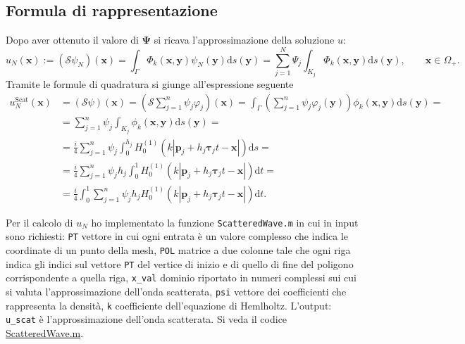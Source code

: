 \subsection{Formula di rappresentazione} \label{ScatteredWave}
Dopo aver ottenuto il valore di $\bm{\Psi}$ si ricava l'approssimazione della soluzione $u$:
\begin{equation}
	u_N(\textbf{x}) := (\mathcal{S}\psi_N)(\textbf{x}) = \int_\Gamma \Phi_k(\textbf{x},\textbf{y}) \psi_N(\textbf{y}) \mathrm{d}s(\textbf{y}) = \sum_{j=1}^N \Psi_j \int_{K_j} \Phi_k(\textbf{x},\textbf{y}) \mathrm{d}s(\textbf{y}), \qquad \textbf{x} \in \Omega_+.
\end{equation}
Tramite le formule di quadratura si giunge all'espressione seguente
\begin{align*}
	u^{\text{Scat}}_N(\textbf{x}) &= (\mathcal{S}\psi)(\textbf{x}) = \left(\mathcal{S} \sum_{j=1}^n \psi_j \varphi_j \right) (\textbf{x}) = \int_{\Gamma} \left( \sum_{j=1}^n \psi_j \varphi_j (\textbf{y}) \right) \phi_k(\textbf{x},\textbf{y}) \mathrm{d}s(\textbf{y}) = \\
	&= \sum_{j=1}^n \psi_j \int_{K_j} \phi_k(\textbf{x},\textbf{y}) \mathrm{d}s(\textbf{y}) = \\
	&= \frac{i}{4} \sum_{j=1}^n \psi_j \int_0^{h_j} H_0^{(1)}(k|\textbf{p}_j + h_j\bm{\tau}_jt -\textbf{x}|) \mathrm{d}s = \\
	&= \frac{i}{4} \sum_{j=1}^n \psi_j h_j \int_0^1 H^{(1)}_0 (k|\textbf{p}_j + h_j\bm{\tau}_jt -\textbf{x}|) \mathrm{d}t = \\
	&= \frac{i}{4} \int_0^1 \sum_{j=1}^n \psi_j h_j H_0^{(1)} (k|\textbf{p}_j + h_j\bm{\tau}_jt -\textbf{x}|) \mathrm{d}t.
\end{align*}

Per il calcolo di $u_N$ ho implementato la funzione \verb|ScatteredWave.m| in cui in input sono richiesti: \verb|PT| vettore in cui ogni entrata è un valore complesso che indica le coordinate di un punto della mesh, \verb|POL| matrice a due colonne tale che ogni riga indica gli indici sul vettore \verb|PT| del vertice di inizio e di quello di fine del poligono corrispondente a quella riga, \verb|x_val| dominio riportato in numeri complessi sui cui si valuta l'approssimazione dell'onda scatterata, \verb|psi| vettore dei coefficienti che rappresenta la densità, \verb|k| coefficiente dell'equazione di Hemlholtz. L'output: \verb|u_scat| è l'approssimazione dell'onda scatterata. Si veda il codice \href{https://github.com/Daldossi/BEM/blob/main/ScatteredWave.m}{ScatteredWave.m}.

